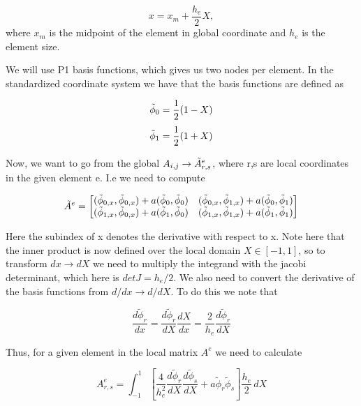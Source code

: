 \documentclass[norsk,a4paper,12pt]{scrartcl}
\begin{document}
\begin{equation}
    x = x_m + \frac{h_e}{2}X,
\end{equation}
where $x_m$ is the midpoint of the element in global coordinate and $h_e$ is the element size.

We will use P1 basis functions, which gives us two nodes per element. In the standardized coordinate system we have that the basis functions are defined as 

\begin{equation}
    \Tilde{\phi}_0 = \frac{1}{2}(1-X)
\end{equation}
\begin{equation}
    \Tilde{\phi}_1 = \frac{1}{2}(1+X)
\end{equation}

Now, we want to go from the global $A_{i, j} \to \Tilde{A}_{r,s}^e$, where r,s are local coordinates in the given element e. I.e we need to compute 

\begin{equation}
    \Tilde{A}^e = 
    \begin{bmatrix}
    (\Tilde{\phi}_{0,x}, \Tilde{\phi}_{0,x} ) + a(\Tilde{\phi}_0, \Tilde{\phi}_0 ) & (\Tilde{\phi}_{0,x}, \Tilde{\phi}_{1,x})+ a(\Tilde{\phi}_0, \Tilde{\phi}_1 ) \\
    (\Tilde{\phi}_{1,x}, \Tilde{\phi}_{0,x})+ a(\Tilde{\phi}_1, \Tilde{\phi}_0 ) & (\Tilde{\phi}_{1,x},\Tilde{\phi}_{1,x}) + a(\Tilde{\phi}_1, \Tilde{\phi}_1 )
    \end{bmatrix}
\end{equation}

Here the subindex of x denotes the derivative with respect to x. Note here that the inner product is now defined over the local domain $X \in [-1,1]$, so to transform $dx \to dX$ we need to multiply the integrand with the jacobi determinant, which here is $det J = h_e/2$. We also need to convert the derivative of the basis functions from $d/dx \to d/dX$. To do this we note that 

\begin{equation*}
    \frac{d \tilde{\phi}_r}{dx} = \frac{d\tilde{\phi}_r}{dX} \frac{dX}{dx} = \frac{2}{h_e} \frac{d\tilde{\phi}_r}{dX}
\end{equation*}

Thus, for a given element in the local matrix $A^e$ we need to calculate

\begin{equation}\label{eq:local_mat_rs_calc}
    A_{r,s}^{e} = \int_{-1}^1 \left[ \frac{4}{h_e^2}\frac{d\tilde{\phi}_r}{dX}\frac{d\tilde{\phi}_s}{dX} + a\tilde{\phi}_r\tilde{\phi}_s \right]\frac{h_e}{2}\, dX
\end{equation}
\end{document}
